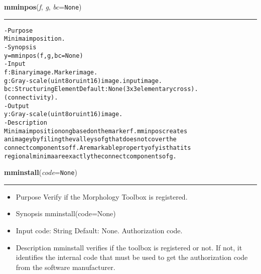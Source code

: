     \begin{boxedminipage}{\textwidth}

    \raggedright \textbf{mminpos}(\textit{f}, \textit{g}, \textit{bc}=\texttt{N\-o\-n\-e\-})

    \vspace{-1.5ex}

    \rule{\textwidth}{0.5\fboxrule}
\begin{alltt}
- Purpose
    Minima imposition.
- Synopsis
    y = mminpos(f, g, bc=None)
- Input
    f:  Binary image. Marker image.
    g:  Gray-scale (uint8 or uint16) image. input image.
    bc: Structuring Element Default: None (3x3 elementary cross).
        (connectivity).
- Output
    y: Gray-scale (uint8 or uint16) image.
- Description
    Minima imposition on g based on the marker f . mminpos creates
    an image y by filing the valleys of g that does not cover the
    connect components of f . A remarkable property of y is that its
    regional minima are exactly the connect components of g .\end{alltt}

    \vspace{1ex}

    \end{boxedminipage}

    \label{multireg:num_pymorph:mminstall}
    \vspace{0.5ex}

    \begin{boxedminipage}{\textwidth}

    \raggedright \textbf{mminstall}(\textit{code}=\texttt{N\-o\-n\-e\-})

    \vspace{-1.5ex}

    \rule{\textwidth}{0.5\fboxrule}
    \begin{itemize}
    \setlength{\parskip}{0.6ex}
      \item Purpose Verify if the Morphology Toolbox is registered.

      \item Synopsis mminstall(code=None)

      \item Input code: String Default: None. Authorization code.

      \item Description mminstall verifies if the toolbox is registered or 
        not. If not, it identifies the internal code that must be used to 
        get the authorization code from the software manufacturer.

    \end{itemize}

    \vspace{1ex}

    \end{boxedminipage}

